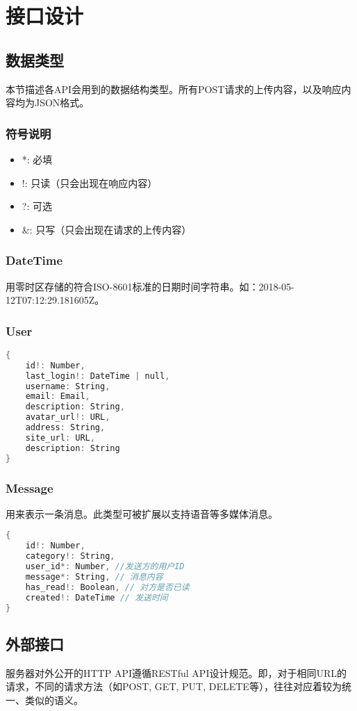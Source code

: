 \chapter{接口设计}
\section{数据类型}
本节描述各API会用到的数据结构类型。所有POST请求的上传内容，以及响应内容均为JSON格式。
\subsection{符号说明}
\begin{itemize}
    \item  *: 必填
    \item  !: 只读（只会出现在响应内容）
    \item  ?: 可选
    \item  \&: 只写（只会出现在请求的上传内容）
\end{itemize}
\subsection{DateTime}
用零时区存储的符合ISO-8601标准的日期时间字符串。如：2018-05-12T07:12:29.181605Z。
\subsection{User}
\begin{lstlisting}[language=C]
{
    id!: Number,
    last_login!: DateTime | null,
    username: String,
    email: Email,
    description: String,
    avatar_url!: URL,
    address: String,
    site_url: URL,
    description: String
}
\end{lstlisting}
\subsection{Message}
用来表示一条消息。此类型可被扩展以支持语音等多媒体消息。
\begin{lstlisting}[language=C]
{
    id!: Number,
    category!: String,
    user_id*: Number, //发送方的用户ID
    message*: String, // 消息内容
    has_read!: Boolean, // 对方是否已读
    created!: DateTime // 发送时间
}
\end{lstlisting}


\section{外部接口}
服务器对外公开的HTTP API遵循RESTful API设计规范。即，对于相同URL的请求，不同的请求方法（如POST, GET, PUT, DELETE等），往往对应着较为统一、类似的语义。

